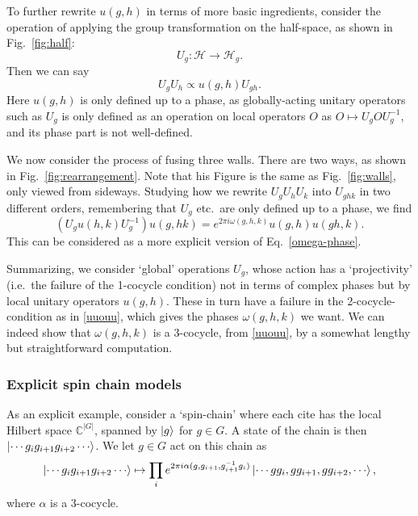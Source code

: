 \documentclass[12pt]{article}
\numberwithin{equation}{section}
\numberwithin{figure}{section}
\theoremstyle{remark}
\def\bC{\mathbb{C}}
\def\cH{\mathcal{H}}
\begin{document}
To further rewrite $u(g,h)$ in terms of more basic ingredients,
consider the operation of applying the group transformation on the half-space,
as shown in Fig.~\ref{fig:half}: \begin{equation}
U_g: \cH \to \cH_{g}.
\end{equation}
Then we can say \begin{equation}
U_g U_h \propto u(g,h) U_{gh}.
\end{equation}
Here $u(g,h)$ is only defined up to a phase, as globally-acting unitary operators such as $U_g$ is 
only defined as an operation on local operators $O$ as $O\mapsto U_g O U_g^{-1}$,
and its phase part is not well-defined.

We now consider the process of fusing three walls. There are two ways, as shown in 
Fig.~\ref{fig:rearrangement}.
Note that his Figure is the same as Fig.~\ref{fig:walls}, only viewed from sideways. 
Studying how we rewrite $U_g U_h U_k$ into $U_{ghk}$ in two different orders,
remembering that $U_g$ etc.~are only defined up to a phase,
we find \begin{equation}
( U_g u(h,k) U_g^{-1})  u(g,hk)= e^{2\pi i \omega(g,h,k)} u(g,h) u(gh,k)  .\label{uuouu}
\end{equation}
This can be considered as a more explicit version of Eq.~\ref{omega-phase}.

Summarizing, we consider `global' operations $U_g$,
whose action has a `projectivity' (i.e.~the failure of the 1-cocycle condition)
not in terms of complex phases 
but by local unitary operators $u(g,h)$.
These in turn have a failure in the 2-cocycle-condition as in \eqref{uuouu},
which gives the phases $\omega(g,h,k)$ we want.
We can indeed show  that $\omega(g,h,k)$ is a 3-cocycle, from \eqref{uuouu},
by a somewhat lengthy but straightforward computation.

\subsubsection{Explicit spin chain models}


As an explicit example, consider a `spin-chain' where each cite has the local Hilbert space $\bC^{|G|}$,
spanned by $\ket{g}$ for $g\in G$.
A state of the chain is then $\ket{\cdots g_i g_{i+1} g_{i+2} \cdots}$.
We let $g\in G$ act on this chain as \begin{equation}
\ket{\cdots g_i g_{i+1} g_{i+2} \cdots}
\mapsto 
\prod_i e^{2\pi i \alpha(g,  g_{i+1} ,  g_{i+1}^{-1} g_i )}
\ket{\cdots gg_i ,  gg_{i+1},  gg_{i+2},  \cdots},
\label{explicit-action}
\end{equation}
where $\alpha$ is a 3-cocycle. 
\end{document}

